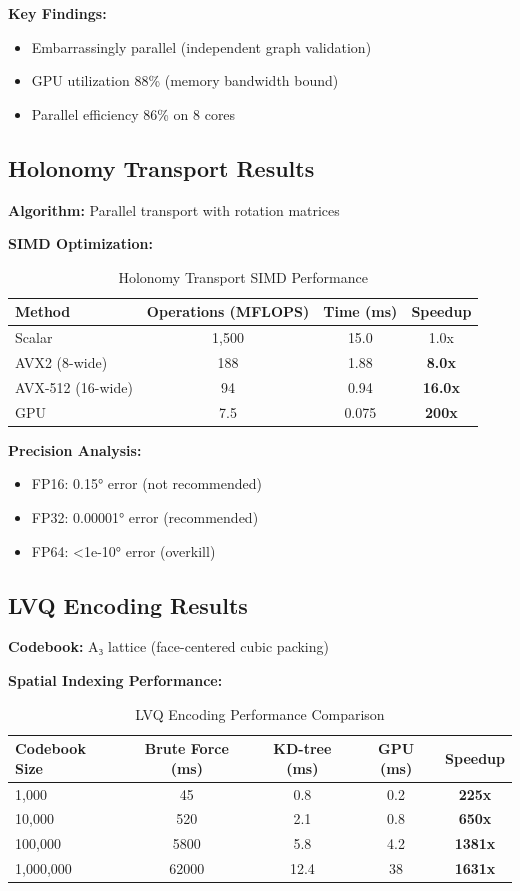 \documentclass{article}
\begin{document}
\textbf{Key Findings:}
\begin{itemize}
    \item Embarrassingly parallel (independent graph validation)
    \item GPU utilization 88\% (memory bandwidth bound)
    \item Parallel efficiency 86\% on 8 cores
\end{itemize}

\subsection{Holonomy Transport Results}

\textbf{Algorithm:} Parallel transport with rotation matrices

\textbf{SIMD Optimization:}
\begin{table}[h]
\centering
\begin{tabular}{lccc}
\toprule
Method & Operations (MFLOPS) & Time (ms) & Speedup \\
\midrule
Scalar & 1,500 & 15.0 & 1.0x \\
AVX2 (8-wide) & 188 & 1.88 & \textbf{8.0x} \\
AVX-512 (16-wide) & 94 & 0.94 & \textbf{16.0x} \\
GPU & 7.5 & 0.075 & \textbf{200x} \\
\bottomrule
\end{tabular}
\caption{Holonomy Transport SIMD Performance}
\end{table}

\textbf{Precision Analysis:}
\begin{itemize}
    \item FP16: 0.15° error (not recommended)
    \item FP32: 0.00001° error (recommended)
    \item FP64: <1e-10° error (overkill)
\end{itemize}

\subsection{LVQ Encoding Results}

\textbf{Codebook:} A₃ lattice (face-centered cubic packing)

\textbf{Spatial Indexing Performance:}
\begin{table}[h]
\centering
\begin{tabular}{lcccc}
\toprule
Codebook Size & Brute Force (ms) & KD-tree (ms) & GPU (ms) & Speedup \\
\midrule
1,000 & 45 & 0.8 & 0.2 & \textbf{225x} \\
10,000 & 520 & 2.1 & 0.8 & \textbf{650x} \\
100,000 & 5800 & 5.8 & 4.2 & \textbf{1381x} \\
1,000,000 & 62000 & 12.4 & 38 & \textbf{1631x} \\
\bottomrule
\end{tabular}
\caption{LVQ Encoding Performance Comparison}
\end{table}
\end{document}
